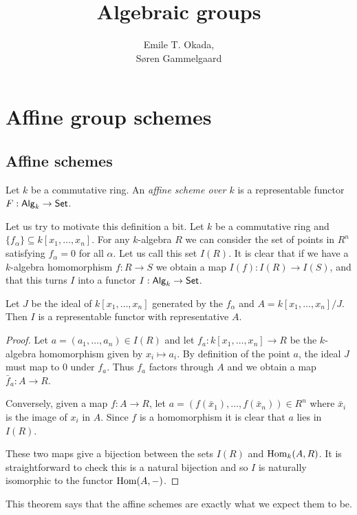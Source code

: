 \documentclass{memoir}
\title{Algebraic groups}
\author{Emile T. Okada,\\ S\o ren Gammelgaard}
\begin{document}
\maketitle
\tableofcontents
\chapter{Affine group schemes}
\section{Affine schemes}
\begin{definition}
    Let $k$ be a commutative ring. An \textit{affine scheme over $k$} is a representable functor $F:{\normalfont\mathsf{Alg}}_k\to {\normalfont\mathsf{Set}}$.
\end{definition}
Let us try to motivate this definition a bit. 
Let $k$ be a commutative ring and $\{f_\alpha\}\subseteq k[x_1,\dots,x_n]$.
For any $k$-algebra $R$ we can consider the set of points in $R^n$ satisfying $f_\alpha = 0$ for all $\alpha$.
Let us call this set $I(R)$.
It is clear that if we have a $k$-algebra homomorphism $f:R\to S$ we obtain a map $I(f):I(R) \to I(S)$, and that this turns $I$ into a functor $I:{\normalfont\mathsf{Alg}}_k\to {\normalfont\mathsf{Set}}$.
\begin{theorem}
    Let $J$ be the ideal of $k[x_1,\dots,x_n]$ generated by the $f_\alpha$ and $A = k[x_1,\dots,x_n]/J$.
    Then $I$ is a representable functor with representative $A$.
\end{theorem}
\begin{proof}
    Let $a = (a_1,\dots,a_n)\in I(R)$ and let $f_a:k[x_1,\dots,x_n]\to R$ be the $k$-algebra homomorphism given by $x_i\mapsto a_i$.
    By definition of the point $a$, the ideal $J$ must map to 0 under $f_a$.
    Thus $f_a$ factors through $A$ and we obtain a map $\bar f_a: A\to R$.

    Conversely, given a map $f:A\to R$, let $a = (f(\bar x_1),\dots,f(\bar x_n))\in R^n$ where $\bar x_i$ is the image of $x_i$ in $A$.
    Since $f$ is a homomorphism it is clear that $a$ lies in $I(R)$.

    These two maps give a bijection between the sets $I(R)$ and $\operatorname{Hom}_k(A,R)$.
    It is straightforward to check this is a natural bijection and so $I$ is naturally isomorphic to the functor $\operatorname{Hom}(A,-)$.
\end{proof}
This theorem says that the affine schemes are exactly what we expect them to be.
\end{document}
